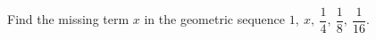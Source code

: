 Find the missing term \(x\) in the geometric sequence \(1,\ x,\ \dfrac{1}{4},\ \dfrac{1}{8},\ \dfrac{1}{16}\).
